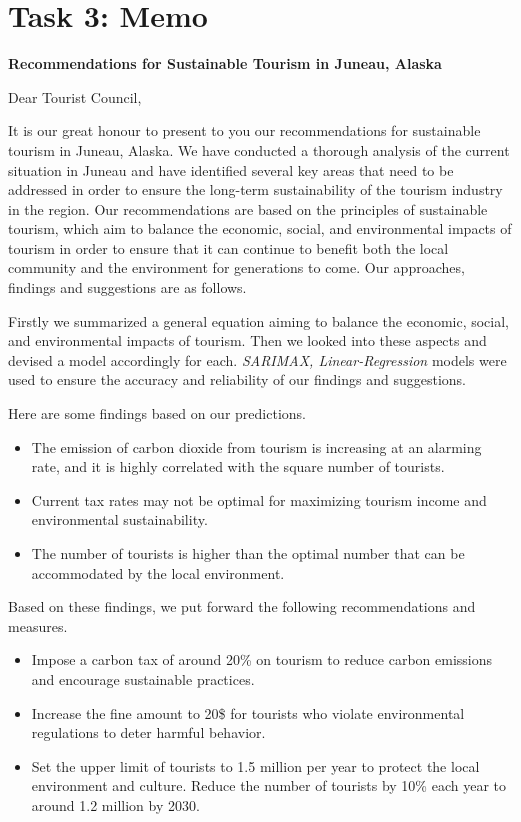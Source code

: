 \section{Task 3: Memo}
\begin{center}
    \Large\textbf{Recommendations for Sustainable Tourism in Juneau, Alaska}
\end{center}

{

Dear Tourist Council,

It is our great honour to present to you our recommendations for 
sustainable tourism in Juneau, Alaska. We have conducted a thorough 
analysis of the current situation in Juneau and have identified several key 
areas that need to be addressed in order to ensure the long-term sustainability 
of the tourism industry in the region. 
Our recommendations are based on the principles of sustainable tourism, 
which aim to balance the economic, social, and environmental impacts of tourism 
in order to ensure that it can continue to benefit both the local community and 
the environment for generations to come. Our approaches, findings and suggestions are as follows.

Firstly we summarized a general equation aiming to balance the economic, social, 
and environmental impacts of tourism. Then we looked into these aspects
and devised a model accordingly for each. \textit{SARIMAX, Linear-Regression} models 
were used to ensure the accuracy and reliability of our findings and suggestions.

Here are some findings based on our predictions.

\begin{itemize}
    \item The emission of carbon dioxide from tourism is increasing at an alarming rate, and it is 
    highly correlated with the square number of tourists.
    \item Current tax rates may not be optimal for maximizing tourism income and environmental sustainability.
    \item The number of tourists is higher than the optimal number that can be accommodated by the local environment.
\end{itemize}

Based on these findings, we put forward the following recommendations and measures.

\begin{itemize}
    \item Impose a carbon tax of around 20\% on tourism to reduce carbon emissions and encourage sustainable practices.
    \item Increase the fine amount to 20\$ for tourists who violate environmental regulations to deter harmful behavior.
    \item Set the upper limit of tourists to 1.5 million per year to protect the local environment and culture. Reduce the number of tourists by 10\% each year to around 1.2 million by 2030.
\end{itemize}

}
